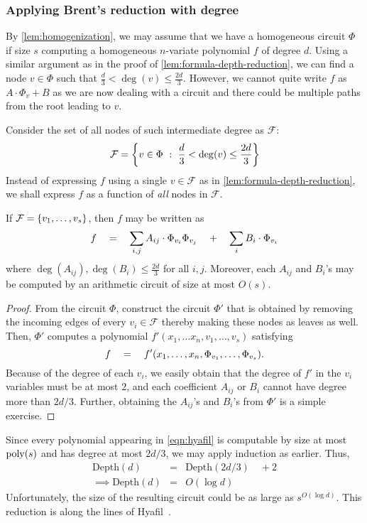 \subsubsection{Applying Brent's reduction with degree}

By \autoref{lem:homogenization}, we may assume that we have a homogeneous circuit $\Phi$ if size $s$ computing a homogeneous $n$-variate polynomial $f$ of degree $d$. Using a similar argument as in the proof of \autoref{lem:formula-depth-reduction}, we can find a node $v \in \Phi$ such that $\frac{d}{3} < \deg(v) \leq \frac{2d}{3}$. However, we cannot quite write $f$ as $A \cdot \Phi_v + B$ as we are now dealing with a circuit and there could be multiple paths from the root leading to $v$.

Consider the set of all nodes of such intermediate degree as $\mathcal{F}$:
\[
\mathcal{F} = \left\{{v\in \Phi}\ : \ {\frac{d}{3} < \deg(v)\leq \frac{2d}{3}}\right\}
\]
Instead of expressing $f$ using a single $v\in \mathcal{F}$ as in \autoref{lem:formula-depth-reduction}, we shall express $f$ as a function of \emph{all} nodes in $\mathcal{F}$. 

\begin{claim}
If $\mathcal{F} = \left\{v_1,\dots, v_s\right\}$, then $f$ may be written as
\begin{equation}\label{eqn:hyafil}
f \quad = \quad \sum_{i,j} A_{ij} \cdot \Phi_{v_i} \Phi_{v_j} \quad + \quad \sum_i B_i \cdot \Phi_{v_i}
\end{equation}
where $\deg(A_{ij}), \deg(B_i) \leq \frac{2d}{3}$ for all $i,j$. Moreover, each $A_{ij}$ and $B_i$'s may be computed by an arithmetic circuit of size at most $O(s)$. 
\end{claim}
\begin{proof}
From the circuit $\Phi$, construct the circuit $\Phi'$ that is obtained by removing the incoming edges of every $v_i \in \mathcal{F}$ thereby making these nodes as leaves as well. Then, $\Phi'$ computes a polynomial $f'(x_1,\dots x_n, v_1,\dots, v_s)$ satisfying 
\[
f \quad = \quad f'(x_1,\dots, x_n, \Phi_{v_1},\dots, \Phi_{v_s}).
\]
Because of the degree of each $v_i$, we easily obtain that the degree of $f'$ in the $v_i$ variables must be at most $2$, and each coefficient $A_{ij}$ or $B_i$ cannot have degree more than $2d/3$. Further, obtaining the $A_{ij}$'s and $B_i$'s from $\Phi'$ is a simple exercise. 
\end{proof}

Since every polynomial appearing in \eqref{eqn:hyafil} is computable by size at most $\mathrm{poly}(s)$ and has degree at most $2d/3$, we may apply induction as earlier. Thus,
\begin{eqnarray*}
\mathrm{Depth}(d) & = & \mathrm{Depth}(2d/3) \quad + 2\\
\implies \mathrm{Depth}(d) & = & O(\log d)
\end{eqnarray*}
Unfortunately, the size of the resulting circuit could be as large as $s^{O(\log d)}$.  This reduction is along the lines of Hyafil~\cite{Hyafil1978}. 

